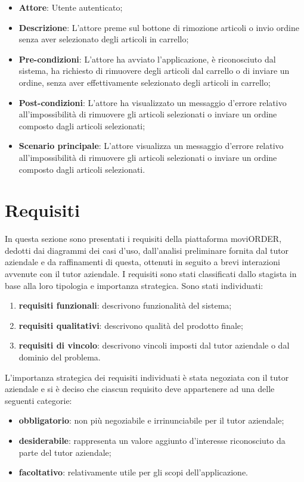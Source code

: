 \begin{itemize}
	\item \textbf{Attore}: Utente autenticato;
	\item \textbf{Descrizione}: L'attore preme sul bottone di rimozione articoli o invio ordine senza aver selezionato degli articoli in carrello;
	\item \textbf{Pre-condizioni}: L'attore ha avviato l'applicazione, è riconosciuto dal sistema, ha richiesto di rimuovere degli articoli dal carrello o di inviare un ordine, senza aver effettivamente selezionato degli articoli in carrello;
	\item \textbf{Post-condizioni}: L'attore ha visualizzato un messaggio d'errore relativo all'impossibilità di rimuovere gli articoli selezionati o inviare un ordine composto dagli articoli selezionati;
	\item \textbf{Scenario principale}: L'attore visualizza un messaggio d'errore relativo all'impossibilità di rimuovere gli articoli selezionati o inviare un ordine composto dagli articoli selezionati.
\end{itemize}

\section{Requisiti}

In questa sezione sono presentati i requisiti della piattaforma moviORDER, dedotti dai diagrammi dei casi d'uso, dall'analisi preliminare fornita dal tutor aziendale e da raffinamenti di questa, ottenuti in seguito a brevi interazioni avvenute con il tutor aziendale. I requisiti sono stati classificati dallo stagista in base alla loro tipologia e importanza strategica. Sono stati individuati:
\begin{enumerate}
	\item \textbf{requisiti funzionali}: descrivono funzionalità del sistema;
	\item \textbf{requisiti qualitativi}: descrivono qualità del prodotto finale;
	\item \textbf{requisiti di vincolo}: descrivono vincoli imposti dal tutor aziendale o dal dominio del problema.
\end{enumerate}

L'importanza strategica dei requisiti individuati è stata negoziata con il tutor aziendale e si è deciso che ciascun requisito deve appartenere ad una delle seguenti categorie:
\begin{itemize}
	\item \textbf{obbligatorio}: non più negoziabile e irrinunciabile per il tutor aziendale;
	\item \textbf{desiderabile}: rappresenta un valore aggiunto d'interesse riconosciuto da parte del tutor aziendale;
	\item \textbf{facoltativo}: relativamente utile per gli scopi dell'applicazione.
\end{itemize}

